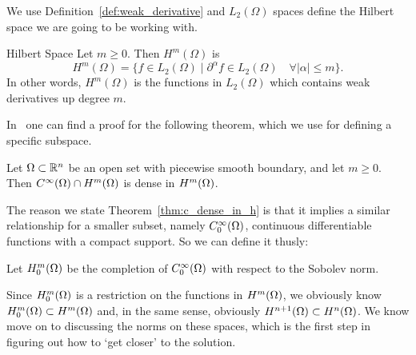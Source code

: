 We use Definition~\ref*{def:weak_derivative} and $L_2(\Omega)$ spaces 
define the Hilbert space we are going to be working with. 
\begin{defn}{Hilbert Space}
   Let $m \geq 0$. Then $H^m(\Omega)$ is 
   \begin{equation*}
    H^m(\Omega) = \{  f \in L_2(\Omega) \mid \partial ^{\alpha}f \in 
    L_2(\Omega) \quad \forall |\alpha| \leq m  \}.
   \end{equation*}
   In other words, $H^m(\Omega)$ is the functions in $L_2(\Omega)$ 
   which contains weak derivatives up degree $m$.
\end{defn}
In~\cite{Brezis} one can find a proof for the following theorem, which 
we use for defining a specific subspace.
\begin{thmx}{\quad}
   Let $\Omega \subset \mathbb{R}^n$ be an open set with piecewise smooth boundary, 
   and let $m \geq 0$. Then $C^\infty (\Omega) \cap H^m(\Omega)$ is dense in 
   $H^m(\Omega)$.\label{thm:c_dense_in_h}
\end{thmx}
The reason we state Theorem~\ref{thm:c_dense_in_h} is that it implies a 
similar relationship for a smaller subset, namely $C^\infty_0(\Omega)$, 
continuous differentiable functions with a compact support. So we can 
define it thusly:
\begin{defn}{\quad}
  Let $H_0^m(\Omega)$ be the completion of $C^\infty_0(\Omega)$ with respect 
  to the Sobolev norm.
\end{defn} 
Since $H_0^m(\Omega)$ is a restriction on the functions in $H^m(\Omega)$, 
we obviously know $H_0^m(\Omega) \subset H^m(\Omega)$ and, in the same 
sense, obviously $H^{n+1}(\Omega) \subset H^n(\Omega)$.
We know move on to discussing the norms on these spaces, 
which is the first step in figuring out how to `get closer' to 
the solution.